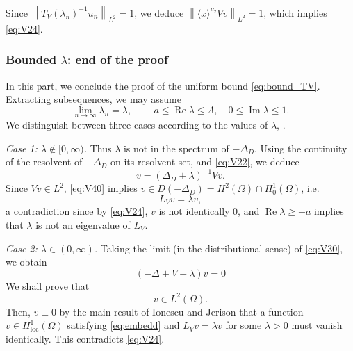 \documentclass[10pt,leqno]{amsart}
\DeclareMathOperator{\im}{Im} %
\DeclareMathOperator{\re}{Re} %
\theoremstyle{definition}%
\theoremstyle{remark}
\numberwithin{equation}{section}
\renewcommand{\^}{\widehat}%
\begin{document}
Since $\left\| T_V(\lambda_n)^{-1}u_n\right\|_{L^2}=1$, we deduce $\left\| \langle x\rangle^{\nu_2}Vv\right\|_{L^2}=1$, which implies \eqref{eq:V24}.

\subsubsection{Bounded $\lambda$: end of the proof} 
\label{sub:end}
In this part, we conclude the proof of the uniform bound  \eqref{eq:bound_TV}. Extracting subsequences, we may assume
$$\lim_{n\to\infty}\lambda_n=\lambda,\quad -a\leq  \re \lambda\leq \Lambda,\quad 0\leq \im \lambda\leq 1.$$
We distinguish between three cases according to the values of $\lambda$, .

\smallskip

\noindent\emph{Case 1: $\lambda\notin [0,\infty)$.} Thus $\lambda$ is not in the spectrum of $-\Delta_D$. Using the continuity of the resolvent of $-\Delta_D$ on its resolvent set, and \eqref{eq:V22}, we deduce
\begin{equation}
\label{eq:V40}
v=(\Delta_D+\lambda)^{-1}Vv.
\end{equation} 
Since $Vv\in L^2$, \eqref{eq:V40} implies $v\in D(-\Delta_D)=H^2(\Omega)\cap H^1_0(\Omega)$, i.e.
$$L_Vv=\lambda v,$$
a contradiction since by \eqref{eq:V24}, $v$ is not identically $0$, and  $\re \lambda \geq -a$ implies that $\lambda$ is not an eigenvalue of $L_V$. 

\smallskip

	\noindent\emph{Case 2: $\lambda\in (0,\infty)$.} 
Taking the limit (in the distributional sense) of \eqref{eq:V30}, we obtain
\begin{equation}
\label{eq:V60}
(-\Delta +V-\lambda)v=0
\end{equation} 
We shall prove that %
\begin{equation}
\label{eq:embedd}
v\in L^2(\Omega).
\end{equation}
Then,  $v\equiv 0$ by the main result of Ionescu and Jerison \cite{IoJe03}  that a function $v\in H^1_{\mathrm{loc}}(\Omega)$ satisfying \eqref{eq:embedd} and $L_V v=\lambda v$ for some $\lambda>0$ must vanish identically. This contradicts \eqref{eq:V24}. \smallskip
\end{document}
